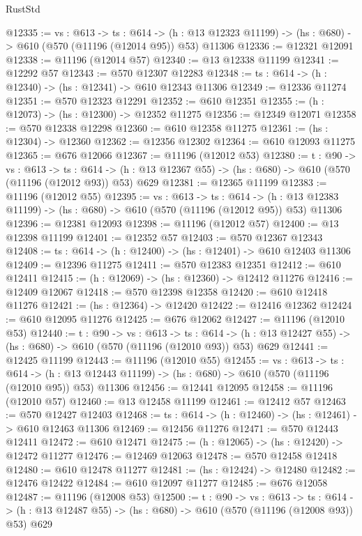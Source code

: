 \begin{lexlean}{RustStd}
\begin{coremodule}
@12335 := {vs : @613} ->
  {ts : @614} ->
  (h : @13 @12323 @11199) -> (hs : @680) -> @610 (@570 (@11196 (@12014 @95)) @53) @11306
@12336 := @12321 @12091
@12338 := @11196 (@12014 @57)
@12340 := @13 @12338 @11199
@12341 := @12292 @57
@12343 := @570 @12307 @12283
@12348 := {ts : @614} -> (h : @12340) -> (hs : @12341) -> @610 @12343 @11306
@12349 := @12336 @11274
@12351 := @570 @12323 @12291
@12352 := @610 @12351
@12355 := (h : @12073) -> (hs : @12300) -> @12352 @11275
@12356 := @12349 @12071
@12358 := @570 @12338 @12298
@12360 := @610 @12358 @11275
@12361 := (hs : @12304) -> @12360
@12362 := @12356 @12302
@12364 := @610 @12093 @11275
@12365 := @676 @12066
@12367 := @11196 (@12012 @53)
@12380 := {t : @90} ->
  {vs : @613} ->
  {ts : @614} -> (h : @13 @12367 @55) -> (hs : @680) -> @610 (@570 (@11196 (@12012 @93)) @53) @629
@12381 := @12365 @11199
@12383 := @11196 (@12012 @55)
@12395 := {vs : @613} ->
  {ts : @614} ->
  (h : @13 @12383 @11199) -> (hs : @680) -> @610 (@570 (@11196 (@12012 @95)) @53) @11306
@12396 := @12381 @12093
@12398 := @11196 (@12012 @57)
@12400 := @13 @12398 @11199
@12401 := @12352 @57
@12403 := @570 @12367 @12343
@12408 := {ts : @614} -> (h : @12400) -> (hs : @12401) -> @610 @12403 @11306
@12409 := @12396 @11275
@12411 := @570 @12383 @12351
@12412 := @610 @12411
@12415 := (h : @12069) -> (hs : @12360) -> @12412 @11276
@12416 := @12409 @12067
@12418 := @570 @12398 @12358
@12420 := @610 @12418 @11276
@12421 := (hs : @12364) -> @12420
@12422 := @12416 @12362
@12424 := @610 @12095 @11276
@12425 := @676 @12062
@12427 := @11196 (@12010 @53)
@12440 := {t : @90} ->
  {vs : @613} ->
  {ts : @614} -> (h : @13 @12427 @55) -> (hs : @680) -> @610 (@570 (@11196 (@12010 @93)) @53) @629
@12441 := @12425 @11199
@12443 := @11196 (@12010 @55)
@12455 := {vs : @613} ->
  {ts : @614} ->
  (h : @13 @12443 @11199) -> (hs : @680) -> @610 (@570 (@11196 (@12010 @95)) @53) @11306
@12456 := @12441 @12095
@12458 := @11196 (@12010 @57)
@12460 := @13 @12458 @11199
@12461 := @12412 @57
@12463 := @570 @12427 @12403
@12468 := {ts : @614} -> (h : @12460) -> (hs : @12461) -> @610 @12463 @11306
@12469 := @12456 @11276
@12471 := @570 @12443 @12411
@12472 := @610 @12471
@12475 := (h : @12065) -> (hs : @12420) -> @12472 @11277
@12476 := @12469 @12063
@12478 := @570 @12458 @12418
@12480 := @610 @12478 @11277
@12481 := (hs : @12424) -> @12480
@12482 := @12476 @12422
@12484 := @610 @12097 @11277
@12485 := @676 @12058
@12487 := @11196 (@12008 @53)
@12500 := {t : @90} ->
  {vs : @613} ->
  {ts : @614} -> (h : @13 @12487 @55) -> (hs : @680) -> @610 (@570 (@11196 (@12008 @93)) @53) @629

\end{coremodule}
\end{lexlean}

